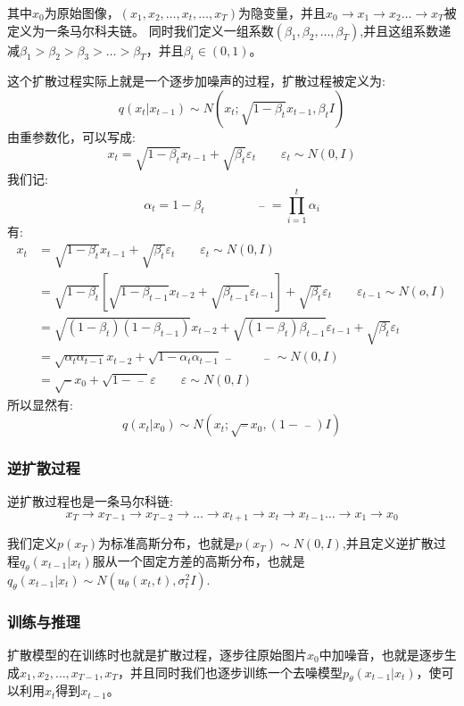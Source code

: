 \documentclass[withoutpreface,bwprint]{cumcmthesis} %
\begin{document}
	其中$x_0$为原始图像，$(x_1,x_2,\ldots,x_t,\ldots,x_T)$为隐变量，并且$x_0 \rightarrow x_1 \rightarrow x_2 \ldots \rightarrow x_T$被定义为一条马尔科夫链。
	同时我们定义一组系数$(\beta_{1},\beta_{2},\ldots,\beta_{T})$,并且这组系数递减$\beta_{1} > \beta_{2} > \beta_{3} > \ldots > \beta_{T}$，并且$\beta_{i} \in \left(0,1\right)$。
	
	这个扩散过程实际上就是一个逐步加噪声的过程，扩散过程被定义为:
	$$
		q(x_{t}|x_{t-1}) \sim N(x_{t};\sqrt{1-\beta_{t}}x_{t-1},\beta_{t}I)
	$$
	由重参数化，可以写成:
	$$
		x_t=\sqrt{1-\beta_{t}}x_{t-1}+\sqrt{\beta_{t}} \varepsilon_t   \quad \quad \varepsilon_t \sim N(0,I)
	$$
	我们记:
		$$
			\alpha_t=1-\beta_{t}  \quad \quad \quad \quad \mathop{\alpha_t}\limits^{-}=\prod_{i=1}^{t} \alpha_i
		$$
	有:
	\begin{align*}
		x_t & =\sqrt{1-\beta_{t}}x_{t-1}+\sqrt{\beta_{t}} \varepsilon_t   \quad \quad \varepsilon_t \sim N(0,I) \\
			& =\sqrt{1-\beta_{t}}\left[\sqrt{1-\beta_{t-1}}x_{t-2}+\sqrt{\beta_{t-1}}\varepsilon_{t-1}  \right] + \sqrt{\beta_{t}} \varepsilon_t  \qquad \varepsilon_{t-1} \sim N(o,I) \\
			& = \sqrt{(1-\beta_{t})(1-\beta_{t-1})} x_{t-2} + \sqrt{\left(1-\beta_{t}\right)\beta_{t-1}}\varepsilon_{t-1} +\sqrt{\beta_{t}}\varepsilon_t \\
			& = \sqrt{\alpha_t\alpha_{t-1}}x_{t-2} + \sqrt{1-\alpha_t\alpha_{t-1}} \mathop{\varepsilon_{t}}\limits^{-} \quad \quad  \mathop{\varepsilon_{t}}\limits^{-} \sim N(0,I) \\
			& = \sqrt{\mathop{\alpha_t}\limits^{-}} x_0 + \sqrt{1-\mathop{\alpha_t}\limits^{-}} \varepsilon \quad \quad \varepsilon \sim N(0,I)
	\end{align*}
	所以显然有:
	$$
		q(x_{t}|x_{0}) \sim N(x_{t};\sqrt{\mathop{\alpha_t}\limits^{-}} x_0,\left( 1-\mathop{\alpha_t}\limits^{-} \right) I)
	$$
	\subsubsection{逆扩散过程}
	逆扩散过程也是一条马尔科链:
	$$
			x_T \longrightarrow x_{T-1} \longrightarrow x_{T-2}  \longrightarrow \ldots \longrightarrow x_{t+1} \longrightarrow x_{t} \longrightarrow x_{t-1} \ldots \longrightarrow x_{1} \longrightarrow x_{0}
	$$
	
	我们定义$p(x_T)$为标准高斯分布，也就是$p(x_T) \sim N(0,I)$,并且定义逆扩散过程$q_{\theta}(x_{t-1}|x_{t})$服从一个固定方差的高斯分布，也就是$q_{\theta}(x_{t-1}|x_{t}) \sim N(u_{\theta}(x_t,t),\sigma_t^2I)$.
	\subsubsection{训练与推理}
	扩散模型的在训练时也就是扩散过程，逐步往原始图片$x_0$中加噪音，也就是逐步生成$x_1,x_2,\ldots,x_{T-1},x_{T}$，并且同时我们也逐步训练一个去噪模型$p_{\theta}(x_{t-1}|x_{t})$，使可以利用$x_{t}$得到$x_{t-1}$。
	
\end{document}
